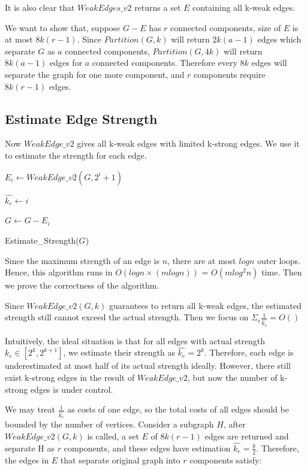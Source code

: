 \documentclass{article}
\begin{document}
It is also clear that $Weak Edges\_v2$ returns a set $E$ containing all k-weak edges. 

We want to show that, suppose $G-E$ has $r$ connected components, size of $E$ is at most $8k(r-1)$. Since $Partition(G, k)$ will return $2k(a-1)$ edges which separate $G$ as $a$ connected components, $Partition(G, 4k)$ will return $8k(a-1)$ edges for $a$ connected components. Therefore every $8k$ edges will separate the graph for one more component, and $r$ components require $8k(r-1)$ edges.

\subsection{Estimate Edge Strength}
Now $WeakEdge\_v2$ gives all k-weak edges with limited k-strong edges. We use it to estimate the strength for each edge. 
\begin{algorithm}[H]
\SetAlgoLined

     {
        $E_i \gets WeakEdge\_v2(G, 2^i+1)$\;
        
         {
            $\hat{k_e} \gets i$\;
        }
    
        $G \gets G - E_i$\;
    }
        
\caption{Estimate\_Strength($G$)}
\end{algorithm}

Since the maximum strength of an edge is $n$, there are at most $logn$ outer loops. Hence, this algorithm runs in $O(logn \times (mlogn))$ = $O(mlog^2n)$ time. Then we prove the correctness of the algorithm.

Since $Weak Edge\_v2(G, k)$ guarantees to return all k-weak edges, the estimated strength still cannot exceed the actual strength. Then we focus on $\Sigma_{e} \frac{1}{\hat{k_e}} = O()$

Intuitively, the ideal situation is that for all edges with actual strength $k_e \in [2^k, 2^{k+1}]$, we estimate their strength as $\hat{k_e} = 2^k$. 
Therefore, each edge is underestimated at most half of its actual strength ideally. However, there still exist k-strong edges in the result of $WeakEdge\_v2$, but now the number of k-strong edges is under control.

We may treat $\frac{1}{\hat{k_e}}$ as costs of one edge, so the total costs of all edges should be bounded by the number of vertices.
Consider a subgraph $H$, after $WeakEdge\_v2(G, k)$ is called, a set $E$ of $8k(r-1)$ edges are returned and separate H as $r$ components, and these edges have estimation $\hat{k_e} = \frac{k}{2}$. Therefore, the edges in $E$ that separate original graph into $r$ components satisfy:
\end{document}
